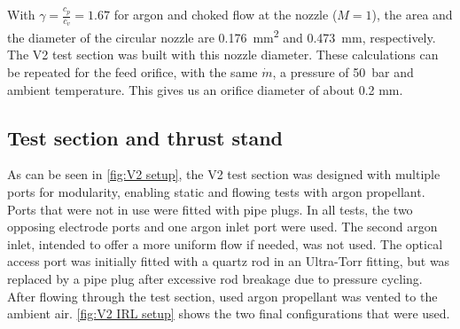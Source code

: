            With $\gamma = \frac{c_p}{c_v} = 1.67$ for argon and choked flow at the nozzle ($M=1$), the area and the diameter of the circular nozzle are \qty{0.176}{mm^2} and \qty{0.473}{mm}, respectively. The V2 test section was built with this nozzle diameter. These calculations can be repeated for the feed orifice, with the same $\dot m$, a pressure of \qty{50}{bar} and ambient temperature. This gives us an orifice diameter of about 0.2 mm.
        
        \subsection{Test section and thrust stand}
            
            As can be seen in \autoref{fig:V2 setup}, the V2 test section was designed with multiple ports for modularity, enabling static and flowing tests with argon propellant. Ports that were not in use were fitted with pipe plugs. In all tests, the two opposing electrode ports and one argon inlet port were used. The second argon inlet, intended to offer a more uniform flow if needed, was not used. The optical access port was initially fitted with a quartz rod in an Ultra-Torr fitting, but was replaced by a pipe plug after excessive rod breakage due to pressure cycling. After flowing through the test section, used argon propellant was vented to the ambient air. \autoref{fig:V2 IRL setup} shows the two final configurations that were used.

